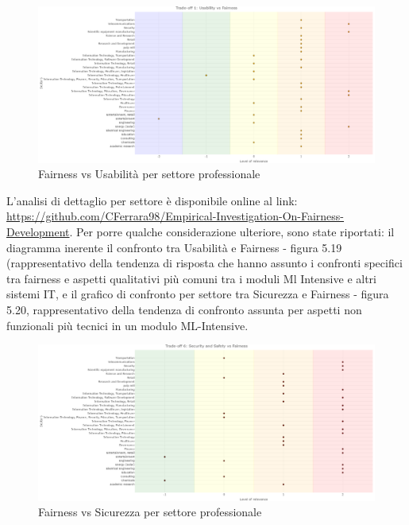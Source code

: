     
    \begin{figure}[h!]
        \centering
        \includegraphics[width=1\textwidth]{figure/Analisi/RQ3/TradeOffsBySectors/1. UsabilityVsFairness.png}
        \caption{Fairness vs Usabilità per settore professionale}
    \end{figure}
    
    L'analisi di dettaglio per settore è disponibile online al link: \url{https://github.com/CFerrara98/Empirical-Investigation-On-Fairness-Development}. Per porre qualche considerazione ulteriore, sono state riportati: il diagramma inerente il confronto tra Usabilità e Fairness - figura 5.19 (rappresentativo della tendenza di risposta che hanno assunto i confronti specifici tra fairness e aspetti qualitativi più comuni tra i moduli Ml Intensive e altri sistemi IT,  e il grafico di confronto per settore tra Sicurezza e Fairness - figura 5.20, rappresentativo della tendenza di confronto assunta per aspetti non funzionali più tecnici in un modulo ML-Intensive.
    
    \begin{figure}[h!]
        \centering
        \includegraphics[width=1\textwidth]{figure/Analisi/RQ3/TradeOffsBySectors/6.SecurityAndSafetyVsFairness.png}
        \caption{Fairness vs Sicurezza per settore professionale}
    \end{figure}
    
